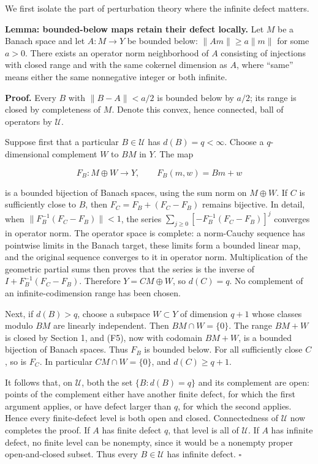 \documentclass[
  11pt,
]{article}
\begin{document}
We first isolate the part of perturbation theory where the infinite
defect matters.

\textbf{Lemma: bounded-below maps retain their defect locally.} Let
\(M\) be a Banach space and let \(A:M\to Y\) be bounded below:
\(\|Am\|\geq a\|m\|\) for some \(a>0\). There exists an operator norm
neighborhood of \(A\) consisting of injections with closed range and
with the same cokernel dimension as \(A\), where ``same'' means either
the same nonnegative integer or both infinite.

\textbf{Proof.} Every \(B\) with \(\|B-A\|<a/2\) is bounded below by
\(a/2\); its range is closed by completeness of \(M\). Denote this
convex, hence connected, ball of operators by \(\mathcal U\).

Suppose first that a particular \(B\in\mathcal U\) has
\(d(B)=q<\infty\). Choose a \(q\)-dimensional complement \(W\) to \(BM\)
in \(Y\). The map

\[
F_B:M\oplus W\longrightarrow Y,\qquad F_B(m,w)=Bm+w             \tag{F5}
\]

is a bounded bijection of Banach spaces, using the sum norm on
\(M\oplus W\). If \(C\) is sufficiently close to \(B\), then
\(F_C=F_B+(F_C-F_B)\) remains bijective. In detail, when
\(\|F_B^{-1}(F_C-F_B)\|<1\), the series
\(\sum_{j\geq0}[-F_B^{-1}(F_C-F_B)]^j\) converges in operator norm. The
operator space is complete: a norm-Cauchy sequence has pointwise limits
in the Banach target, these limits form a bounded linear map, and the
original sequence converges to it in operator norm. Multiplication of
the geometric partial sums then proves that the series is the inverse of
\(I+F_B^{-1}(F_C-F_B)\). Therefore \(Y=CM\oplus W\), so \(d(C)=q\). No
complement of an infinite-codimension range has been chosen.

Next, if \(d(B)>q\), choose a subspace \(W\subset Y\) of dimension
\(q+1\) whose classes modulo \(BM\) are linearly independent. Then
\(BM\cap W=\{0\}\). The range \(BM+W\) is closed by Section 1, and (F5),
now with codomain \(BM+W\), is a bounded bijection of Banach spaces.
Thus \(F_B\) is bounded below. For all sufficiently close \(C\), so is
\(F_C\). In particular \(CM\cap W=\{0\}\), and \(d(C)\geq q+1\).

It follows that, on \(\mathcal U\), both the set \(\{B:d(B)=q\}\) and
its complement are open: points of the complement either have another
finite defect, for which the first argument applies, or have defect
larger than \(q\), for which the second applies. Hence every
finite-defect level is both open and closed. Connectedness of
\(\mathcal U\) now completes the proof. If \(A\) has finite defect
\(q\), that level is all of \(\mathcal U\). If \(A\) has infinite
defect, no finite level can be nonempty, since it would be a nonempty
proper open-and-closed subset. Thus every \(B\in\mathcal U\) has
infinite defect. \(\square\)
\end{document}
